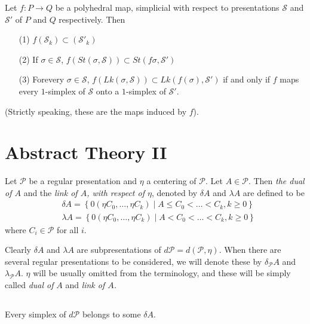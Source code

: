 \begin{ex}\label{chap4-ex4.1.16}
Let $f:P\to Q$ be a polyhedral map, simplicial with respect to presentations $\mathscr{S}$ and $\mathscr{S}'$ of $P$ and $Q$ respectively. Then
\begin{itemize}
\item[(1)] $f(\mathscr{S}_{k})\subset (\mathscr{S}'_{k})$

\item[(2)] If $\sigma\in \mathscr{S}$, $f(St(\sigma,\mathscr{S}))\subset St(f\sigma,\mathscr{S}')$

\item[(3)] For\pageoriginale every $\sigma\in \mathscr{S}$, $f(Lk(\sigma,\mathscr{S}))\subset Lk(f(\sigma),\mathscr{S}')$ if and only if $f$ maps every $1$-simplex of $\mathscr{S}$ onto a $1$-simplex of $\mathscr{S}'$.
\end{itemize}
\end{ex}

(Strictly speaking, these are the maps induced by $f$).

\section{Abstract Theory II}\label{chap4-sec4.2}

\begin{definition}\label{chap4-defi4.2.1}
Let $\mathscr{P}$ be a regular presentation and $\eta$ a centering of $\mathscr{P}$. Let $A\in \mathscr{P}$. Then {\em the dual of $A$} and the {\em link of $A$, with respect of $\eta$}, denoted by $\delta A$ and $\lambda A$ are defined to be 
\begin{align*}
& \delta A=\left\{0(\eta C_{0},\ldots,\eta C_{k})\mid A\leq C_{0}<\ldots<C_{k},k\geq 0\right\}\\
& \lambda A=\left\{0(\eta C_{0},\ldots,\eta C_{k})\mid A<C_{0}<\ldots<C_{k},k\geq 0\right\}
\end{align*}
where $C_{i}\in\mathscr{P}$ for all $i$.
\end{definition}

Clearly $\delta A$ and $\lambda A$ are subpresentations of $d\mathscr{P}=d(\mathscr{P},\eta)$. When there are several regular presentations to be considered, we will denote these by $\delta_{\mathscr{P}}A$ and $\lambda_{\mathscr{P}}A$. $\eta$ will be usually omitted from the terminology, and these will be simply called {\em dual of} $A$ and {\em link of $A$.}

\setcounter{subsection}{1}
\subsection{}\label{chap4-sec4.2.2}
Every simplex of $d\mathscr{P}$ belongs to some $\delta A$.

